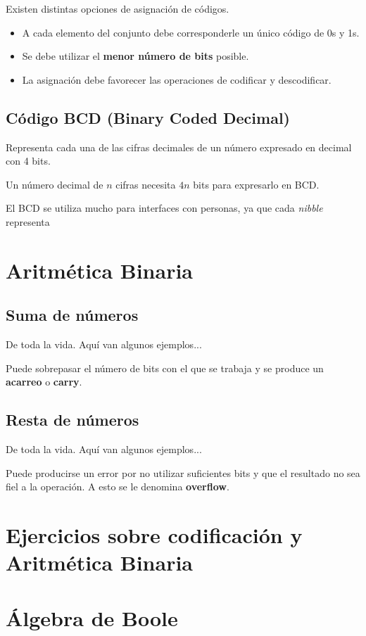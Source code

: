 \documentclass[a4paper]{book}
\begin{document}
Existen distintas opciones de asignación de códigos. \begin{itemize}
\item A cada elemento del conjunto debe corresponderle un único código de 0s y 1s.
\item Se debe utilizar el \textbf{menor número de bits} posible.
\item La asignación debe favorecer las operaciones de codificar y descodificar.
\end{itemize}
\subsection{Código BCD (Binary Coded Decimal)}
Representa cada una de las cifras decimales de un número expresado en decimal con 4 bits.

Un número decimal de $n$ cifras necesita $4n$ bits para expresarlo en BCD.

El BCD se utiliza mucho para interfaces con personas, ya que cada \textit{nibble} representa  
\section{Aritmética Binaria}

\subsection{Suma de números}
De toda la vida. Aquí van algunos ejemplos...

Puede sobrepasar el número de bits con el que se trabaja y se produce un \textbf{acarreo} o \textbf{carry}.

\subsection{Resta de números}
De toda la vida. Aquí van algunos ejemplos...

Puede producirse un error por no utilizar suficientes bits y que el resultado no sea fiel a la operación. A esto se le denomina \textbf{overflow}.

\section{Ejercicios sobre codificación y Aritmética Binaria}


\section{Álgebra de Boole}
\end{document}
